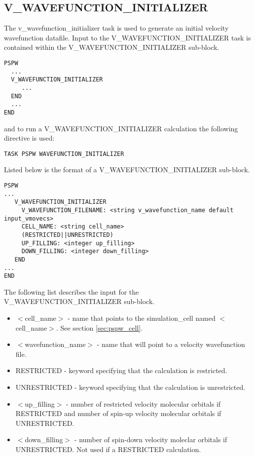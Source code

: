 \subsection{V\_WAVEFUNCTION\_INITIALIZER}
The v\_wavefunction\_initializer task is used to generate an initial velocity 
wavefunction datafile.
Input to the V\_WAVEFUNCTION\_INITIALIZER task is contained
within the V\_WAVEFUNCTION\_INITIALIZER sub-block.
\begin{verbatim}
PSPW
  ...
  V_WAVEFUNCTION_INITIALIZER
     ...
  END
  ...
END
\end{verbatim}
and to run a V\_WAVEFUNCTION\_INITIALIZER calculation the following directive 
is used:
\begin{verbatim}
TASK PSPW WAVEFUNCTION_INITIALIZER
\end{verbatim}
Listed below is the format of a V\_WAVEFUNCTION\_INITIALIZER sub-block.
\begin{verbatim}
PSPW
... 
   V_WAVEFUNCTION_INITIALIZER
     V_WAVEFUNCTION_FILENAME: <string v_wavefunction_name default input_vmovecs>
     CELL_NAME: <string cell_name>
     (RESTRICTED||UNRESTRICTED)
     UP_FILLING: <integer up_filling>
     DOWN_FILLING: <integer down_filling>
   END
...
END
\end{verbatim}
The following list describes the input for the V\_WAVEFUNCTION\_INITIALIZER
sub-block.
\begin{itemize}
        \item $<$cell\_name$>$ - name that points 
                to the simulation\_cell named $<$cell\_name$>$.  See section \ref{sec:pspw_cell}.
        \item $<$wavefunction\_name$>$ - name that will point
              to a velocity wavefunction file.
        \item RESTRICTED - keyword specifying that the calculation is restricted.
        \item UNRESTRICTED - keyword specifying that the calculation is unrestricted.
        \item $<$up\_filling$>$ - number of restricted velocity molecular 
              orbitals if RESTRICTED and number of spin-up velocity molecular 
              orbitals if UNRESTRICTED.
        \item $<$down\_filling$>$ - number of spin-down velocity moleclar 
              orbitals if UNRESTRICTED.  Not used if a RESTRICTED calculation.
\end{itemize}



